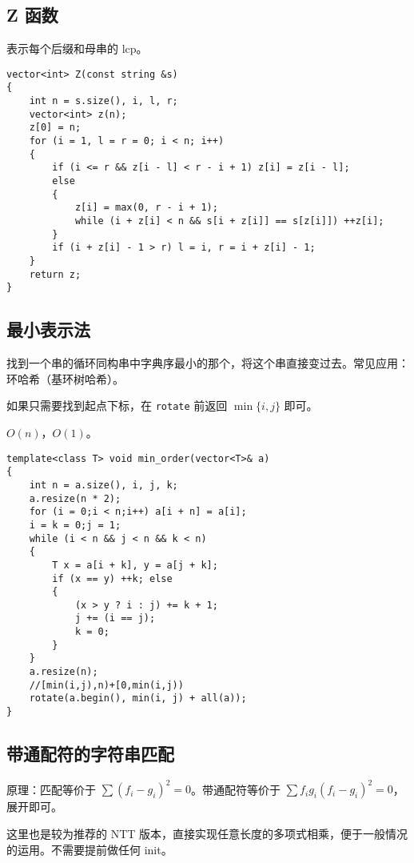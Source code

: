 \documentclass[12pt]{ctexart}
\begin{document}
\subsection{Z 函数}

表示每个后缀和母串的 lcp。

\begin{lstlisting}
vector<int> Z(const string &s)
{
	int n = s.size(), i, l, r;
	vector<int> z(n);
	z[0] = n;
	for (i = 1, l = r = 0; i < n; i++)
	{
		if (i <= r && z[i - l] < r - i + 1) z[i] = z[i - l];
		else
		{
			z[i] = max(0, r - i + 1);
			while (i + z[i] < n && s[i + z[i]] == s[z[i]]) ++z[i];
		}
		if (i + z[i] - 1 > r) l = i, r = i + z[i] - 1;
	}
	return z;
}

\end{lstlisting}



\subsection{最小表示法}

找到一个串的循环同构串中字典序最小的那个，将这个串直接变过去。常见应用：环哈希（基环树哈希）。

如果只需要找到起点下标，在 \verb|rotate| 前返回 $\min\{i,j\}$ 即可。

$O(n)$，$O(1)$。

\begin{lstlisting}
template<class T> void min_order(vector<T>& a)
{
	int n = a.size(), i, j, k;
	a.resize(n * 2);
	for (i = 0;i < n;i++) a[i + n] = a[i];
	i = k = 0;j = 1;
	while (i < n && j < n && k < n)
	{
		T x = a[i + k], y = a[j + k];
		if (x == y) ++k; else
		{
			(x > y ? i : j) += k + 1;
			j += (i == j);
			k = 0;
		}
	}
	a.resize(n);
	//[min(i,j),n)+[0,min(i,j))
	rotate(a.begin(), min(i, j) + all(a));
}
\end{lstlisting}
\subsection{带通配符的字符串匹配}

原理：匹配等价于 $\sum (f_i-g_i)^2=0$。带通配符等价于 $\sum f_ig_i(f_i-g_i)^2=0$，展开即可。

这里也是较为推荐的 NTT 版本，直接实现任意长度的多项式相乘，便于一般情况的运用。不需要提前做任何 init。
\end{document}
